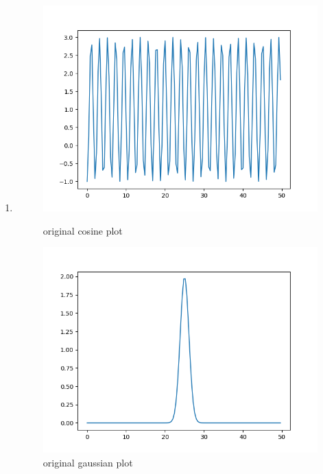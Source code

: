\documentclass[a4paper,11pt,english]{article}
\begin{document}
\begin{enumerate}
\begin{enumerate}
		\item 
		
		\begin{figure}[H]
			\includegraphics[width=\linewidth]{cgp/cosines_original}
			\caption{original cosine plot}
			\endminipage \hfill
			\includegraphics[width=\linewidth]{cgp/gauss_original}
			\caption{original gaussian plot}
			\endminipage \hfill
		\end{figure}
		\begin{figure}[H]

\end{figure}
\end{enumerate}
\end{enumerate}
\end{document}
